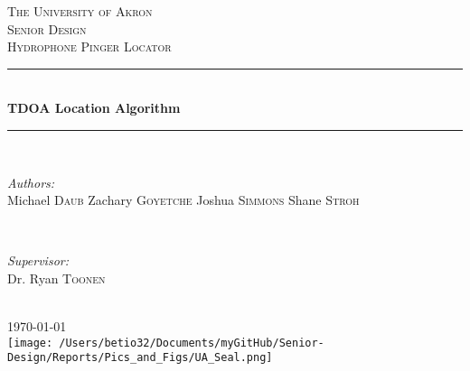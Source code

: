 \documentclass[12pt]{article}
\begin{document}
\begin{titlepage}
\newcommand{\HRule}{\rule{\linewidth}{0.5mm}}
\center

\textsc{\LARGE The University of Akron}\\[1.5cm]
\textsc{\Large Senior Design}\\[0.5cm]
\textsc{\large Hydrophone Pinger Locator}\\[0.5cm]

\HRule \\[0.4cm]
{ \huge \bfseries TDOA Location Algorithm}\\[0.4cm]
\HRule \\[1.5cm]

\begin{minipage}{0.4\textwidth}
\begin{flushleft} \large
\emph{Authors:}\\
Michael \textsc{Daub}\newline
Zachary \textsc{Goyetche}\newline
Joshua \textsc{Simmons}\newline
Shane \textsc{Stroh}
\end{flushleft}
\end{minipage}
~
\begin{minipage}{0.4\textwidth}
\begin{flushright} \large
\emph{Supervisor:} \\
Dr. Ryan \textsc{Toonen}
\end{flushright}
\end{minipage}\\[2cm]

{\large \today}\\[0.5cm]

\texttt{[image: /Users/betio32/Documents/myGitHub/Senior-Design/Reports/Pics\_and\_Figs/UA\_Seal.png]}

\vfill

\end{titlepage}


\renewcommand*\contentsname{Summary}
\tableofcontents
\pagebreak

\end{document}
